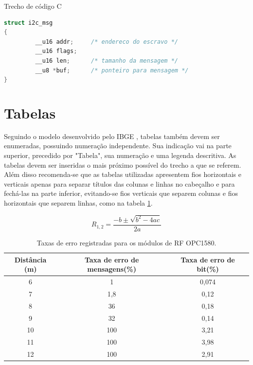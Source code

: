 \documentclass[repeatfields,xlists,xpacks,oneside]{ufrgscca}
\begin{document}
\begin{codelist}[htbp]
\caption{Trecho de código C}
\label{code01}
\begin{lstlisting}[language=C]
struct i2c_msg
{
         __u16 addr;     /* endereco do escravo */
         __u16 flags;
         __u16 len;      /* tamanho da mensagem */
         __u8 *buf;      /* ponteiro para mensagem */
}
\end{lstlisting}
{}
\end{codelist}



\section{Tabelas}

Seguindo o modelo desenvolvido pelo IBGE \cite{IBGE:tabular-1993}, tabelas também devem ser enumeradas, possuindo numeração independente. Sua
indicação vai na parte superior, precedido por "Tabela", sua numeração e uma
legenda descritiva. As tabelas devem ser inseridas o
mais próximo possível do trecho a que se referem.
 Além disso recomenda-se que as tabelas utilizadas apresentem fios
horizontais e verticais apenas para separar títulos das colunas e linhas no
cabeçalho e para fechá-las na parte inferior, evitando-se fios verticais que
separem colunas e fios horizontais que separem linhas, como na tabela \ref{standarttable}.

\begin{equation}
    R_{1,2}=\frac{-b\pm\sqrt{b^2-4ac}}{2a}
\end{equation}



\begin{table}[htb]
 \begin{center}
  \caption{Taxas de erro registradas para os módulos de RF OPC1580.}\label{standarttable}
  \begin{tabular}{c|cc}
  \hline
  Distância (m) & Taxa de erro de mensagens(\%) & Taxa de erro de bit(\%)\\
  \hline
  6	& 1 	& 0,074\\
  7	& 1,8	& 0,12\\
  8 	& 36  	& 0,18\\
  9	& 32  	& 0,14\\
  10	& 100	& 3,21\\
  11	& 100	& 3,98\\
  12	& 100	& 2,91\\
  \hline
  \end{tabular}
 \end{center}
{}
\end{table}
\end{document}
